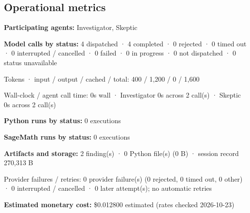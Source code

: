 \documentclass[11pt]{article}
\begin{document}
\subsection{Operational metrics}
\textbf{Participating agents:} Investigator, Skeptic\par
\textbf{Model calls by status:} 4 dispatched · 4 completed · 0 rejected · 0 timed out · 0 interrupted / cancelled · 0 failed · 0 in progress · 0 not dispatched · 0 status unavailable\par
Tokens · input / output / cached / total: 400 / 1,200 / 0 / 1,600\par
Wall-clock / agent call time: 0s wall · Investigator 0s across 2 call(s) · Skeptic 0s across 2 call(s)\par
\textbf{Python runs by status:} 0 executions\par
\textbf{SageMath runs by status:} 0 executions\par
\textbf{Artifacts and storage:} 2 finding(s) · 0 Python file(s) (0 B) · session record 270,313 B\par
Provider failures / retries: 0 provider failure(s) (0 rejected, 0 timed out, 0 other) · 0 interrupted / cancelled · 0 later attempt(s); no automatic retries\par
\textbf{Estimated monetary cost:} \$0.012800 estimated (rates checked 2026-10-23)\par
\end{document}
